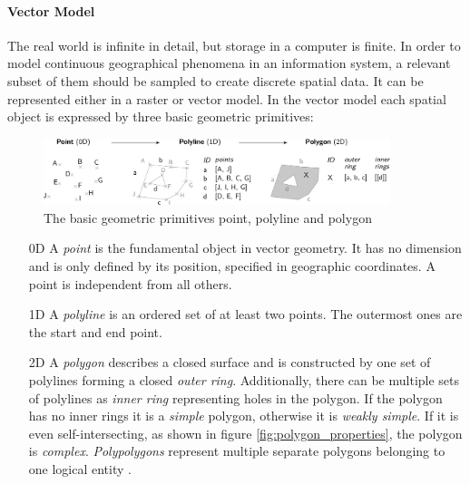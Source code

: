 \paragraph{Vector Model} %
\label{ssub:vector_model}

The real world is infinite in detail, but storage in a computer is finite. In order to model continuous geographical phenomena in an information system, a relevant subset of them should be sampled to create discrete spatial data. It can be represented either in a raster or vector model. In the vector model each spatial object is expressed by three basic geometric primitives:

\begin{figure}[H]
  \vspace{1em}
  \centering
  \includegraphics[width=0.9\textwidth]{graphics/basics/hgis/geometric_primitives}
  \caption{The basic geometric primitives point, polyline and polygon}
  \label{fig:geometric_primitives}
\end{figure}

\begin{enumerate}
  \item[0D] A \emph{point} is the fundamental object in vector geometry. It has no dimension and is only defined by its position, specified in geographic coordinates. A point is independent from all others.
  \item[1D] A \emph{polyline} is an ordered set of at least two points. The outermost ones are the start and end point.
  \item[2D] A \emph{polygon} describes a closed surface and is constructed by one set of polylines forming a closed \emph{outer ring}. Additionally, there can be multiple sets of polylines as \emph{inner ring} representing holes in the polygon. If the polygon has no inner rings it is a \emph{simple} polygon, otherwise it is \emph{weakly simple}. If it is even self-intersecting, as shown in figure \ref{fig:polygon_properties}, the polygon is \emph{complex}. \emph{Polypolygons} represent multiple separate polygons belonging to one logical entity \cite{polygons}.
\end{enumerate}

